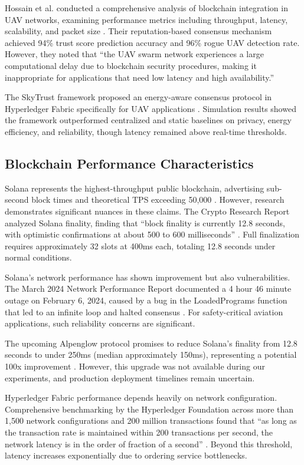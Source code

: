 \documentclass[conference]{IEEEtran}
\begin{document}
Hossain et al. conducted a comprehensive analysis of blockchain integration in UAV networks, examining performance metrics including throughput, latency, scalability, and packet size \cite{hossain2024}. Their reputation-based consensus mechanism achieved 94\% trust score prediction accuracy and 96\% rogue UAV detection rate. However, they noted that ``the UAV swarm network experiences a large computational delay due to blockchain security procedures, making it inappropriate for applications that need low latency and high availability.''

The SkyTrust framework proposed an energy-aware consensus protocol in Hyperledger Fabric specifically for UAV applications \cite{skytrust2024}. Simulation results showed the framework outperformed centralized and static baselines on privacy, energy efficiency, and reliability, though latency remained above real-time thresholds.

\subsection{Blockchain Performance Characteristics}

Solana represents the highest-throughput public blockchain, advertising sub-second block times and theoretical TPS exceeding 50,000 \cite{solana2024}. However, research demonstrates significant nuances in these claims. The Crypto Research Report analyzed Solana finality, finding that ``block finality is currently 12.8 seconds, with optimistic confirmations at about 500 to 600 milliseconds'' \cite{cryptoresearch2024}. Full finalization requires approximately 32 slots at 400ms each, totaling 12.8 seconds under normal conditions.

Solana's network performance has shown improvement but also vulnerabilities. The March 2024 Network Performance Report documented a 4 hour 46 minute outage on February 6, 2024, caused by a bug in the LoadedPrograms function that led to an infinite loop and halted consensus \cite{solana_perf2024}. For safety-critical aviation applications, such reliability concerns are significant.

The upcoming Alpenglow protocol promises to reduce Solana's finality from 12.8 seconds to under 250ms (median approximately 150ms), representing a potential 100x improvement \cite{alpenglow2024}. However, this upgrade was not available during our experiments, and production deployment timelines remain uncertain.

Hyperledger Fabric performance depends heavily on network configuration. Comprehensive benchmarking by the Hyperledger Foundation across more than 1,500 network configurations and 200 million transactions found that ``as long as the transaction rate is maintained within 200 transactions per second, the network latency is in the order of fraction of a second'' \cite{hyperledger2023}. Beyond this threshold, latency increases exponentially due to ordering service bottlenecks.
\end{document}
